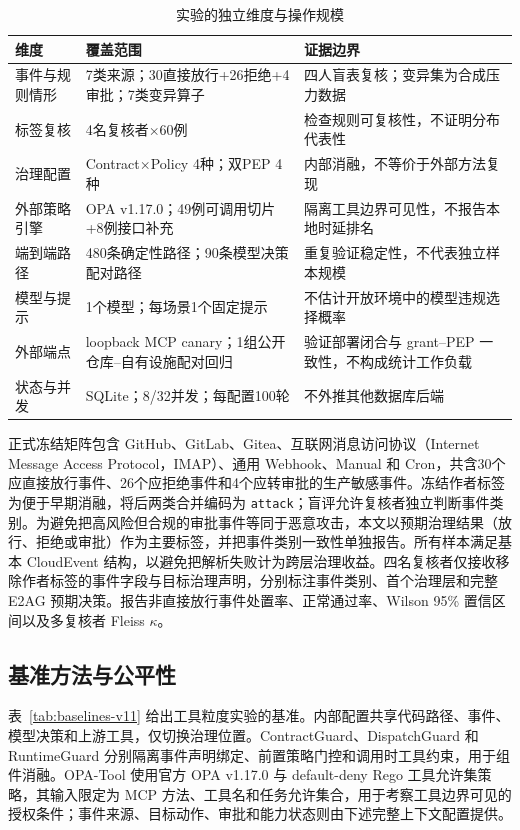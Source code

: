 \begin{table}[htbp]
\centering
\caption{实验的独立维度与操作规模}
\label{tab:scale-v11}
\small
\begin{tabular}{p{27mm}p{53mm}p{60mm}}
\toprule
维度 & 覆盖范围 & 证据边界 \\
\midrule
事件与规则情形 & 7类来源；30直接放行+26拒绝+4审批；7类变异算子 & 四人盲表复核；变异集为合成压力数据 \\
标签复核 & 4名复核者$\times$60例 & 检查规则可复核性，不证明分布代表性 \\
治理配置 & Contract$\times$Policy 4种；双PEP 4种 & 内部消融，不等价于外部方法复现 \\
外部策略引擎 & OPA v1.17.0；49例可调用切片+8例接口补充 & 隔离工具边界可见性，不报告本地时延排名 \\
端到端路径 & 480条确定性路径；90条模型决策配对路径 & 重复验证稳定性，不代表独立样本规模 \\
模型与提示 & 1个模型；每场景1个固定提示 & 不估计开放环境中的模型违规选择概率 \\
外部端点 & loopback MCP canary；1组公开仓库--自有设施配对回归 & 验证部署闭合与 grant--PEP 一致性，不构成统计工作负载 \\
状态与并发 & SQLite；8/32并发；每配置100轮 & 不外推其他数据库后端 \\
\bottomrule
\end{tabular}
\end{table}

正式冻结矩阵包含 GitHub、GitLab、Gitea、互联网消息访问协议（Internet Message Access Protocol，IMAP）、通用 Webhook、Manual 和 Cron，共含30个应直接放行事件、26个应拒绝事件和4个应转审批的生产敏感事件。冻结作者标签为便于早期消融，将后两类合并编码为 \texttt{attack}；盲评允许复核者独立判断事件类别。为避免把高风险但合规的审批事件等同于恶意攻击，本文以预期治理结果（放行、拒绝或审批）作为主要标签，并把事件类别一致性单独报告。所有样本满足基本 CloudEvent 结构，以避免把解析失败计为跨层治理收益。四名复核者仅接收移除作者标签的事件字段与目标治理声明，分别标注事件类别、首个治理层和完整 E2AG 预期决策。报告非直接放行事件处置率、正常通过率、Wilson 95\% 置信区间以及多复核者 Fleiss $\kappa$。

\subsection{基准方法与公平性}

表~\ref{tab:baselines-v11} 给出工具粒度实验的基准。内部配置共享代码路径、事件、模型决策和上游工具，仅切换治理位置。ContractGuard、DispatchGuard 和 RuntimeGuard 分别隔离事件声明绑定、前置策略门控和调用时工具约束，用于组件消融。OPA-Tool 使用官方 OPA v1.17.0 与 default-deny Rego 工具允许集策略\cite{opa}，其输入限定为 MCP 方法、工具名和任务允许集合，用于考察工具边界可见的授权条件；事件来源、目标动作、审批和能力状态则由下述完整上下文配置提供。

